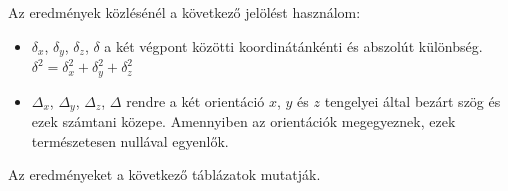 Az eredmények közlésénél a következő jelölést használom:

\begin{itemize}
\item $\delta_x$, $\delta_y$, $\delta_z$, $\delta$ a két végpont közötti koordinátánkénti és abszolút különbség. $\delta^2=\delta_x^2+\delta_y^2+\delta_z^2$
\item $\Delta_x$, $\Delta_y$, $\Delta_z$, $\Delta$ rendre a két orientáció $x$, $y$ és $z$ tengelyei által bezárt szög és ezek számtani közepe. Amennyiben az orientációk megegyeznek, ezek természetesen nullával egyenlők.
\end{itemize}

%
%
%
%
%

Az eredményeket a következő táblázatok mutatják.

